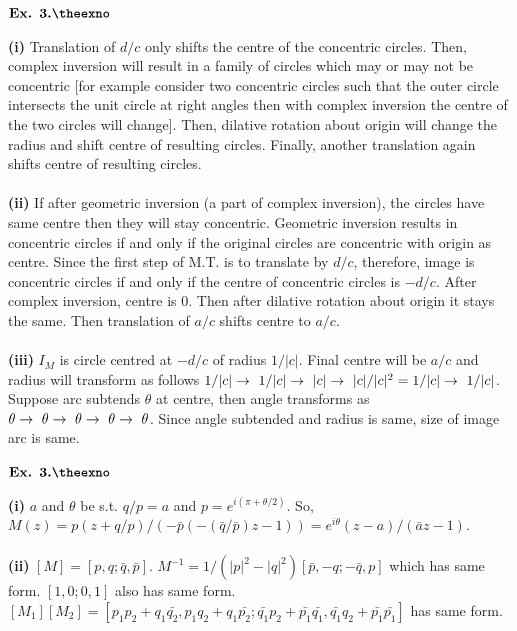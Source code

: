 \documentclass{article}
\def\tf{\textbf}
\def\rto{\ensuremath\rightarrow\ }
\newcounter{exno}
\begin{document}
\vspace{0.2in}

${\textbf{Ex. 3.\theexno}}$
\addtocounter{exno}{1}

\tf{(i)} Translation of $d/c$ only shifts the centre of the concentric circles. Then, complex inversion will result in a family of circles which may or may not be concentric [for example consider two concentric circles such that the outer circle intersects the unit circle at right angles then with complex inversion the centre of the two circles will change]. Then, dilative rotation about origin will change the radius and shift centre of resulting circles. Finally, another translation again shifts centre of resulting circles.\\~\\

\tf{(ii)} If after geometric inversion (a part of complex inversion), the circles have same centre then they will stay concentric. Geometric inversion results in concentric circles if and only if the original circles are concentric with origin as centre. Since the first step of M.T. is to translate by $d/c$, therefore, image is concentric circles if and only if the centre of concentric circles is $-d/c$. After complex inversion, centre is $0$. Then after dilative rotation about origin it stays the same. Then translation of $a/c$ shifts centre to $a/c$.\\~\\

\tf{(iii)} $I_M$ is circle centred at $-d/c$ of radius $1/|c|$. Final centre will be $a/c$ and radius will transform as follows $1/|c| \rto 1/|c| \rto |c| \rto |c|/|c|^2 =1/|c| \rto 1/|c|$. Suppose arc subtends $\theta$ at centre, then angle transforms as $\theta \rto \theta \rto \theta \rto \theta \rto \theta$. Since angle subtended and radius is same, size of image arc is same.

\vspace{0.2in}

${\textbf{Ex. 3.\theexno}}$
\addtocounter{exno}{1}

\tf{(i)} $a$ and $\theta$ be s.t. $q/p = a$ and $p = e^{i(\pi+\theta/2)}$. So, $M(z) = p(z+q/p)/(-\bar{p}(-(\bar{q}/\bar{p})z-1)) = e^{i\theta}(z-a)/(\bar{a}z-1)$.\\~\\

\tf{(ii)} $[M] = [p,q;\bar{q},\bar{p}]$. $M^{-1} = 1/(|p|^2-|q|^2)[\bar{p},-q;-\bar{q},p]$ which has same form. $[1,0;0,1]$ also has same form. $[M_1][M_2] = [p_1p_2 + q_1\bar{q_2}, p_1q_2 + q_1\bar{p_2}; \bar{q_1}p_2 + \bar{p_1}\bar{q_1}, \bar{q_1}q_2 + \bar{p_1}\bar{p_1}]$ has same form.\\~\\
\end{document}
